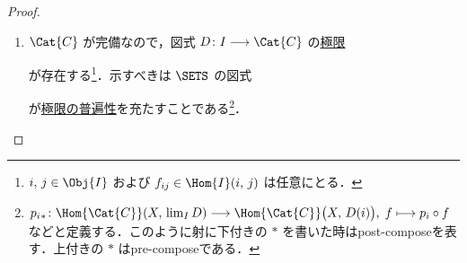 \documentclass[TQFT_main]{subfiles}
\begin{document}
\begin{proof}
    \begin{enumerate}
        \item $\Cat{C}$ が完備なので，図式 $D \colon I \lto \Cat{C}$ の\hyperref[def:limit]{極限}
        \begin{center}
        \end{center}
        が存在する\footnote{$i,\, j \in \Obj{I}$ および $f_{ij} \in \Hom{I}(i,\, j)$ は任意にとる．}．示すべきは $\SETS$ の図式
        \begin{center}
        \end{center}
        が\hyperref[cmtd:lim]{極限の普遍性}を充たすことである\footnote{$p_i{}_* \colon \Hom{\Cat{C}}(X,\, \lim_I D) \lto \Hom{\Cat{C}} \bigl( X,\, D(i) \bigr),\;  f \lmto p_i \circ f$ などと定義する．このように射に下付きの $*$ を書いた時はpost-composeを表す．上付きの $*$ はpre-composeである．}．


\end{enumerate}
\end{proof}
\end{document}
